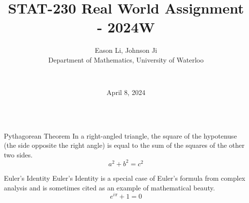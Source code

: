 \documentclass[final]{beamer}
\title{STAT-230 Real World Assignment - 2024W}
\author{
    Eason Li, Johnson Ji \\
    Department of Mathematics, University of Waterloo \and \\
}
\date{April 8, 2024} %
\begin{document}
\maketitle


\begin{frame}[t]
\begin{columns}[t]


    \begin{column}{.48\linewidth}
    \begin{block}{Pythagorean Theorem}
    In a right-angled triangle, the square of the hypotenuse (the side opposite the right angle) is equal to the sum of the squares of the other two sides.
    \[
    a^2 + b^2 = c^2
    \]
    \end{block}

    \begin{block}{Euler's Identity}
    Euler's Identity is a special case of Euler's formula from complex analysis and is sometimes cited as an example of mathematical beauty.
    \[
    e^{i\pi} + 1 = 0
    \]
    \end{block}
    \end{column}


\end{columns}
\end{frame}
\end{document}
